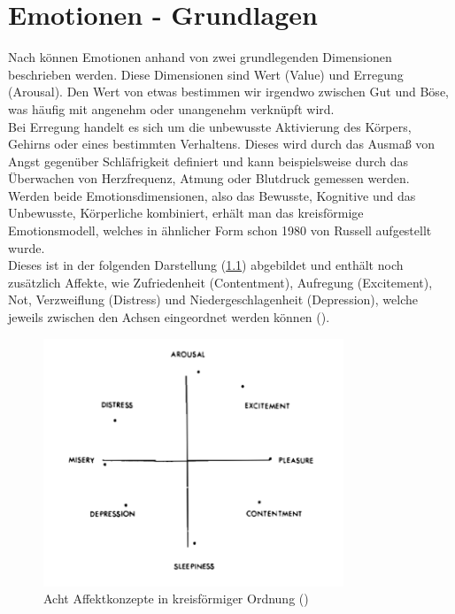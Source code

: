 \documentclass[./dokumentation.tex]{subfiles}
\begin{document}
\chapter{Emotionen - Grundlagen}
Nach  \cite{vanGorp2013} können Emotionen anhand von zwei grundlegenden Dimensionen beschrieben werden. Diese Dimensionen sind Wert (Value) und Erregung (Arousal). Den Wert von etwas bestimmen wir irgendwo zwischen Gut und Böse, was häufig mit angenehm oder unangenehm verknüpft wird. \\
Bei Erregung handelt es sich um die unbewusste Aktivierung des Körpers, Gehirns oder eines bestimmten Verhaltens. Dieses wird durch das Ausmaß von Angst gegenüber Schläfrigkeit definiert und kann beispielsweise durch das Überwachen von Herzfrequenz, Atmung oder Blutdruck gemessen werden. Werden beide Emotionsdimensionen, also das Bewusste, Kognitive und das Unbewusste, Körperliche kombiniert, erhält man das kreisförmige Emotionsmodell, welches in ähnlicher Form schon 1980 von Russell aufgestellt wurde.\\ 
Dieses ist in der folgenden Darstellung (\ref{fig4:affect}) abgebildet und enthält noch zusätzlich Affekte, wie Zufriedenheit (Contentment), Aufregung (Excitement), Not, Verzweiflung (Distress) und Niedergeschlagenheit (Depression), welche jeweils zwischen den Achsen eingeordnet werden können  (\cite{Russell1980}). \\

\begin{figure}[H]
    \centering
    \includegraphics[width=0.8\textwidth]{bilder/russell1.png}
    \caption{Acht Affektkonzepte in kreisförmiger Ordnung (\cite{Russell1980})}
    \label{fig4:affect}
\end{figure}\\
\end{document}
